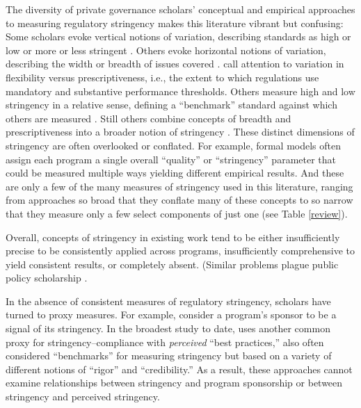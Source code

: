 \documentclass[
      12pt,
            Review ]{article}
\begin{document}
The diversity of private governance scholars' conceptual and empirical approaches to measuring regulatory stringency makes this literature vibrant but confusing: Some scholars evoke vertical notions of variation, describing standards as high or low or more or less stringent \citep{Fischer2014, Li2015}. Others evoke horizontal notions of variation, describing the width or breadth of issues covered \citep{Auld2014, Heyes2017}. \citet{Cashore2007} call attention to variation in flexibility versus prescriptiveness, i.e., the extent to which regulations use mandatory and substantive performance thresholds. Others measure high and low stringency in a relative sense, defining a ``benchmark'' standard against which others are measured \citep{Overdevest2005, Overdevest2010}. Still others combine concepts of breadth and prescriptiveness into a broader notion of stringency \citep{Fransen2011}. These distinct dimensions of stringency are often overlooked or conflated. For example, formal models often assign each program a single overall ``quality'' or ``stringency'' parameter that could be measured multiple ways yielding different empirical results. And these are only a few of the many measures of stringency used in this literature, ranging from approaches so broad that they conflate many of these concepts to so narrow that they measure only a few select components of just one (see Table \ref{review}).

Overall, concepts of stringency in existing work tend to be either insufficiently precise to be consistently applied across programs, insufficiently comprehensive to yield consistent results, or completely absent. (Similar problems plague public policy scholarship \citep[\citet{Howlett2007}]{Brunel2016}.



In the absence of consistent measures of regulatory stringency, scholars have turned to proxy measures. For example, \citet{Darnall2010} consider a program's sponsor to be a signal of its stringency. In the broadest study to date, \citet{VanderVen2015} uses another common proxy for stringency--compliance with \emph{perceived} ``best practices,'' also often considered ``benchmarks'' for measuring stringency but based on a variety of different notions of ``rigor'' and ``credibility.'' As a result, these approaches cannot examine relationships between stringency and program sponsorship or between stringency and perceived stringency.
\end{document}
